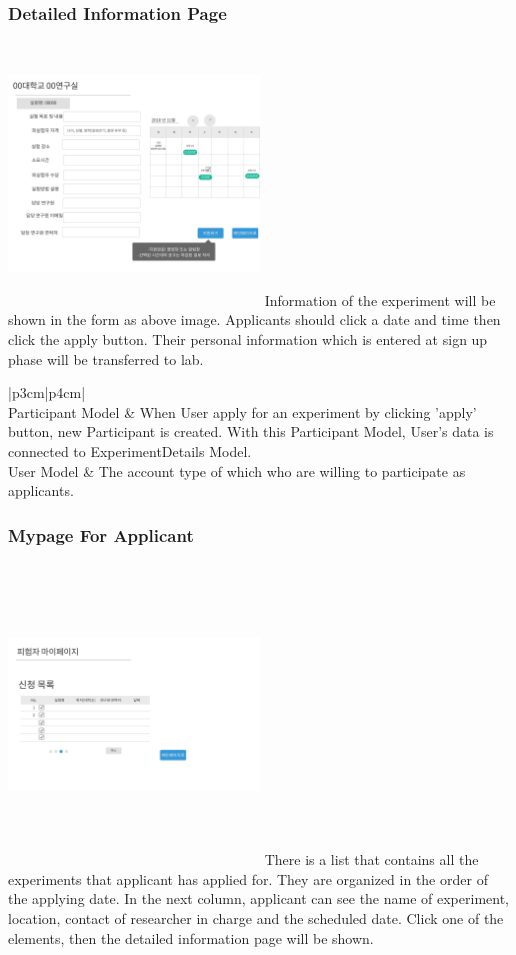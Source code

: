 \documentclass[letterpaper, 10 pt, conference]{ieeeconf}  %
\begin{document}
\subsubsection{Detailed Information Page}
\includegraphics[width=0.5\textwidth,height = 7cm]{Oven_ver2/ver2]12_detailedExperimentPage.jpg}
Information of the experiment will be shown in the form as above image. Applicants should click a date and time then click the apply button. Their personal information which is entered at sign up phase will be transferred to lab. 

\begin{supertabular}{ |p{3cm}|p{4cm}| }
 \hline
  \\
 \hline
 Participant Model & When  User  apply for an experiment by clicking ’apply’ button, new Participant is created.  With this Participant Model, User’s data is connected to ExperimentDetails Model.\\
 \hline
 User Model & The account type of which who are willing to participate as applicants. \\
 \hline
\end{supertabular}

\subsubsection{Mypage For Applicant}
\includegraphics[width=0.5\textwidth,height = 8cm]{Oven_ver2/19_myPageForApplicant.jpg}
There is a list that contains all the experiments that applicant has applied for. They are organized in the order of the applying date. In the next column, applicant can see the name of experiment, location, contact of researcher in charge and the scheduled date. Click one of the elements, then the detailed information page will be shown.
\end{document}
